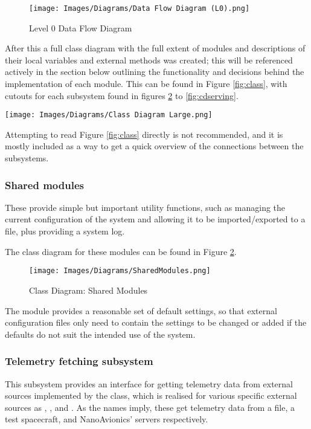 \begin{figure}[H]
  \centering
  \texttt{[image: Images/Diagrams/Data Flow Diagram (L0).png]}
  \caption{Level 0 Data Flow Diagram}
  \label{fig:dfd}
\end{figure}

After this a full class diagram with the full extent of modules and descriptions of their local variables and external methods was created; this will be referenced actively in the section below outlining the functionality and decisions behind the implementation of each module. This can be found in Figure \ref{fig:class}, with cutouts for each subsystem found in figures \ref{fig:cdshared} to \ref{fig:cdserving}.

\begin{sidewaysfigure}[ht]
  \centering
  \texttt{[image: Images/Diagrams/Class Diagram Large.png]}
  \caption{Class Diagram Overview}
  \label{fig:class}
\end{sidewaysfigure}

Attempting to read Figure \ref{fig:class} directly is not recommended, and it is mostly included as a way to get a quick overview of the connections between the subsystems.

\subsubsection{Shared modules}
These provide simple but important utility functions, such as managing the current configuration of the system and allowing it to be imported/exported to a file, plus providing a system log.

The class diagram for these modules can be found in Figure \ref{fig:cdshared}.

\begin{figure}[H]
  \centering
  \texttt{[image: Images/Diagrams/SharedModules.png]}
  \caption{Class Diagram: Shared Modules}
  \label{fig:cdshared}
\end{figure}

The  module provides a reasonable set of default settings, so that external configuration files only need to contain the settings to be changed or added if the defaults do not suit the intended use of the system.

\subsubsection{Telemetry fetching subsystem}
This subsystem provides an interface for getting telemetry data from external sources implemented by the  class, which is realised for various specific external sources as , , and . As the names imply, these get telemetry data from a file, a test spacecraft, and NanoAvionics’ servers respectively.

